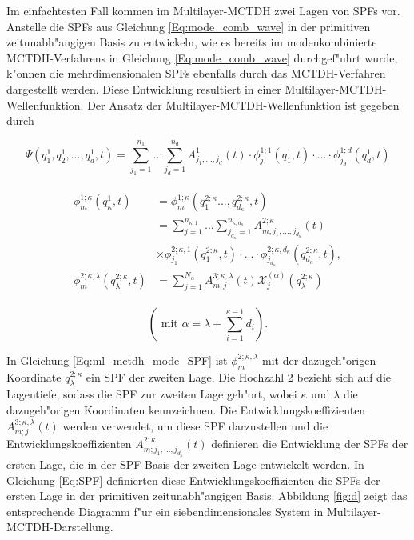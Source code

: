 Im einfachtesten Fall kommen im Multilayer-MCTDH zwei Lagen von SPFs vor.
Anstelle die SPFs aus Gleichung \ref{Eq:mode_comb_wave} in der primitiven zeitunabh"angigen Basis zu entwickeln, wie es bereits
im modenkombinierte MCTDH-Verfahrens in Gleichung \ref{Eq:mode_comb_wave} durchgef"uhrt wurde,
k"onnen die mehrdimensionalen SPFs ebenfalls durch das MCTDH-Verfahren dargestellt werden.
Diese Entwicklung resultiert in einer Multilayer-MCTDH-Wellenfunktion. 
Der Ansatz der Multilayer-MCTDH-Wellenfunktion ist gegeben durch 

\begin{equation}
  \Psi(q^{1}_{1},q^{1}_{2},..., q^{1}_{d}, t)=\sum^{n_{1}}_{j_{1}=1} ... \sum^{n_{d}}_{j_{d}=1} A^{1}_{j_{1}, ..., j_{d}}(t)
  \cdot \phi^{1;1}_{j_{1}}(q^1_{1}, t) \cdot ... \cdot \phi^{1;d}_{j_{d}}(q^1_{d}, t)
  \label{Eq:ml_mctdh_wave}
  \end{equation}

\begin{align}
  \begin{split}
 \phi^{1;\kappa}_{m} (q^1_{\kappa}, t) & =  \phi^{1;\kappa}_{m} (q^{2;\kappa}_1..., q^{2;\kappa}_{d_{\kappa}},t)\\
 & = \sum^{n_{\kappa,1}}_{j=1} ... \sum^{n_{\kappa,d_\kappa}}_{j_{d_\kappa}=1} A^{2;\kappa}_{m;j_1,...,j_{d_\kappa}}(t) \\
 & \times \phi^{2;\kappa,1}_{j_1} (q^{2;\kappa}_{1}, t) \cdot ... \cdot
 \phi^{2;\kappa,d_\kappa}_{j_{d_\kappa}} (q^{2;\kappa}_{d_\kappa}, t),
\\
 \phi^{2;\kappa, \lambda}_{m} (q^{2;\kappa}_{\lambda}, t)&= \sum^{N_{\alpha}}_{j=1} A^{3;\kappa, \lambda}_{m;j}(t)
 \mathcal{X}^{(\alpha)}_{j}(q^{2;\kappa}_\lambda)
 \label{Eq:ml_mctdh_mode_SPF}
  \end{split}
 \end{align}

 \begin{equation}
  \left( \text{ mit } \alpha = \lambda + \sum^{\kappa - 1}_{i=1}d_i \right).
 \end{equation}

In Gleichung \ref{Eq:ml_mctdh_mode_SPF} ist $ \phi^{2;\kappa, \lambda}_{m}  $ 
mit der dazugeh"origen Koordinate $q^{2;\kappa}_\lambda$ ein SPF der zweiten Lage.
Die Hochzahl 2 bezieht sich auf die Lagentiefe, sodass die SPF zur zweiten Lage geh"ort, 
wobei $\kappa$ und $\lambda$ die dazugeh"origen Koordinaten kennzeichnen.
Die Ent\-wicklungskoeffizienten $A^{3;\kappa, \lambda}_{m;j}(t) $ werden verwendet, um diese SPF darzustellen
und die Entwicklungskoeffizienten $A^{2;\kappa}_{m;j_1,...,j_{d_\kappa}}(t)$ definieren die Entwicklung der SPFs der ersten Lage, die
in der SPF-Basis der zweiten Lage entwickelt werden.
In Gleichung \ref{Eq:SPF} definierten diese Entwicklungskoeffizienten die SPFs der ersten Lage in der primitiven zeitunabh"angigen Basis.
Abbildung \ref{fig:d} zeigt das entsprechende Diagramm f"ur ein siebendimensionales System in Multilayer-MCTDH-Darstellung.

